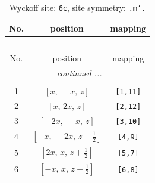 \documentclass[fleqn,8pt]{jsarticle}
\begin{document}
\renewcommand{\arraystretch}{1.2}
\begin{longtable}{ccc}
\caption{Wyckoff site: {\tt 6c}, site symmetry: {\tt .m'.}}
 \\
 \hline \hline
No. & position & mapping \\ \hline \endfirsthead

\multicolumn{2}{l}{\tablename\ \thetable{}} \\
 \hline \hline
No. & position & mapping \\ \hline \endhead

 \hline \hline
\multicolumn{2}{r}{\footnotesize\it continued ...} \\ \endfoot

 \hline \hline
\multicolumn{2}{r}{} \\ \endlastfoot

1 & $\left[ x,\, - x,\, z \right]$ & {\tt [1,11]} \\ \hline
2 & $\left[ x,\, 2 x,\, z \right]$ & {\tt [2,12]} \\ \hline
3 & $\left[ - 2 x,\, - x,\, z \right]$ & {\tt [3,10]} \\ \hline
4 & $\left[ - x,\, - 2 x,\, z + \frac{1}{2} \right]$ & {\tt [4,9]} \\ \hline
5 & $\left[ 2 x,\, x,\, z + \frac{1}{2} \right]$ & {\tt [5,7]} \\ \hline
6 & $\left[ - x,\, x,\, z + \frac{1}{2} \right]$ & {\tt [6,8]} \\
\end{longtable}
\renewcommand{\arraystretch}{1.2}
\end{document}
